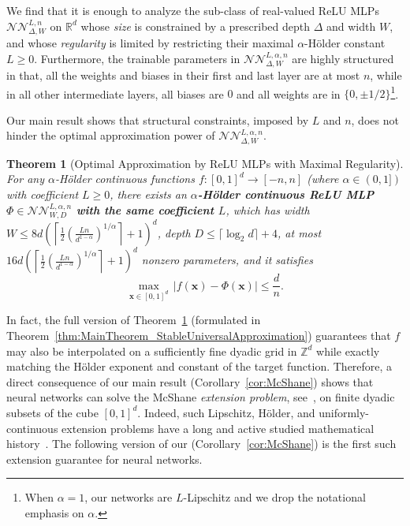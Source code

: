 \documentclass{article}
\numberwithin{equation}{section}
\newtheorem{theorem}{Theorem}[section]
\theoremstyle{definition}
\begin{document}
We find that it is enough to analyze the sub-class of real-valued ReLU MLPs $\mathcal{NN}_{\Delta,W}^{L,n}$ on $\mathbb{R}^d$ whose \textit{size} is constrained by a prescribed depth $\Delta$ and width $W$, and whose \textit{regularity} is limited by restricting their maximal $\alpha$-H\"{o}lder constant $L\ge 0$.  Furthermore, the trainable parameters in $\mathcal{NN}_{\Delta,W}^{L,\alpha,n}$ are highly structured in that, all the weights and biases in their first and last layer are at most $n$, while in all other intermediate layers, all biases are $0$ and all weights are in $\{ 0, \pm 1/2 \}$\footnote{When $\alpha=1$, our networks are $L$-Lipschitz and we drop the notational emphasis on $\alpha$.}.



Our main result shows that structural constraints, imposed by $L$ and $n$, does not hinder the optimal approximation power of $\mathcal{NN}_{\Delta,W}^{L,\alpha,n}$.
\begin{theorem}[Optimal Approximation by ReLU MLPs with Maximal Regularity]
\label{thm:main_IntroVersion}
For any $\alpha$-H\"{o}lder continuous functions $f:[0,1]^d \rightarrow[-n,n]$ (where $\alpha\in(0,1])$ with coefficient $L\ge 0$, there exists an \textbf{$\alpha$-H\"{o}lder continuous ReLU MLP $\Phi\in\mathcal{NN}_{W,D}^{L,\alpha,n}$ with the same coefficient $L$}, which has width $W \le 8d \left(
\left\lceil 
    \frac{1}{2} \left( \frac{L n}{d^{1-\alpha}} \right)^{1/\alpha} \right\rceil
+1 \right)^d$, depth $D \le \lceil \log_2{d} \rceil + 4$, at most 
$16d\left(
\left\lceil 
    \frac{1}{2} \left( \frac{L n}{d^{1-\alpha}} \right)^{1/\alpha} \right\rceil
+1 \right)^d$ nonzero parameters, and it satisfies
\[
        \max_{\mathbf{x}\in [0,1]^d}\,
            |f(\mathbf{x})-\Phi(\mathbf{x})|
    \le 
        \frac{d}{n}
.
\]
\end{theorem}
In fact, the full version of Theorem~\ref{thm:main_IntroVersion} (formulated in Theorem~\ref{thm:MainTheorem_StableUniversalApproximation}) guarantees that $f$ may also be interpolated on a sufficiently fine dyadic grid in $\mathbb{Z}^d$ while exactly matching the H\"{o}lder exponent and constant of the target function.  Therefore, a direct consequence of our main result (Corollary~\ref{cor:McShane}) shows that neural networks can solve the McShane \textit{extension problem}, see~\cite{McShaneOGPaper1993}, on finite dyadic subsets of the cube $[0,1]^d$.  Indeed, such Lipschitz, H\"{o}lder, and uniformly-continuous extension problems have a long and active studied mathematical history~\cite{flett1974extensions,johnson1984extensions,matouvskova2000extensions,lee2005extending,oberman2008explicit,naor2017lipschitz,brue2021linear,beer2020mcshane,ambrosio2020linear}.  The following version of our (Corollary~\ref{cor:McShane}) is the first such extension guarantee for neural networks.
\end{document}

